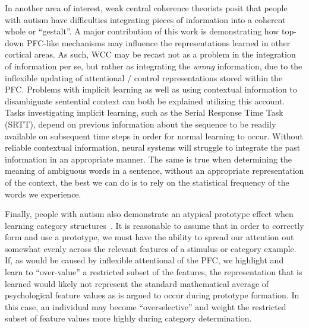 
In another area of interest, weak central coherence theorists posit that people with autism have difficulties integrating pieces of information into a coherent whole or ``gestalt''\cite{FrithU:1989:AutismWCC,HappeF:1999:WCC}.  A major contribution of this work is demonstrating how top-down PFC-like mechanisms may influence the representations learned in other cortical areas.  As such, WCC may be recast not as a problem in the integration of information per se, but rather as integrating the \emph{wrong} information, due to the inflexible updating of attentional / control representations stored within the PFC.   Problems with implicit learning as well as using contextual information to disambiguate sentential context can both be explained utilizing this account.  Tasks investigating implicit learning, such as the Serial Response Time Task (SRTT), depend on previous information about the sequence to be readily available on subsequent time steps in order for normal learning to occur.  Without reliable contextual information, neural systems will struggle to integrate the past information in an appropriate manner.  The same is true when determining the meaning of ambiguous words in a sentence, without an appropriate representation of the context, the best we can do is to rely on the statistical frequency of the words we experience.   

Finally, people with autism also demonstrate an atypical prototype effect when learning category structures~\cite{RefWorks:113,StraussMS:2009:Prototype}.   It is reasonable to assume that in order to correctly form and use a prototype, we must have the ability to spread our attention out somewhat evenly across the relevant features of a stimulus or category example.  If, as would be caused by inflexible attentional of the PFC, we highlight and learn to ``over-value'' a restricted subset of the features, the representation that is learned would likely not represent the standard mathematical average of psychological feature values as is argued to occur during prototype formation.  In this case, an individual may become ``overselective'' and weight the restricted subset of feature values more highly during category determination.  

